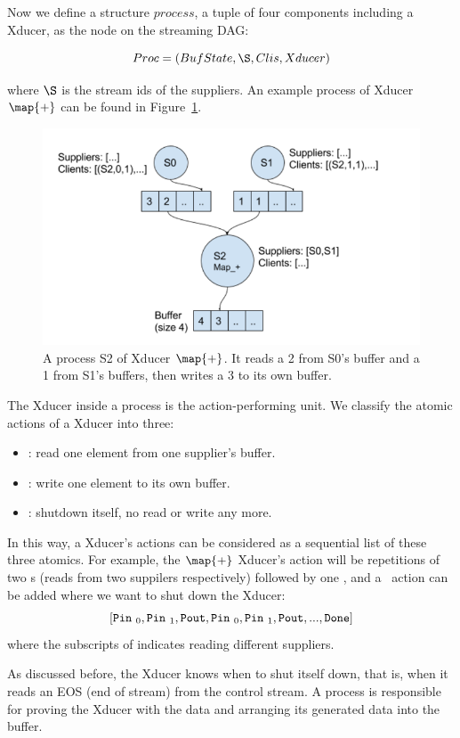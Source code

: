Now we define a structure $process$, a tuple of four components including a Xducer, as the node on the streaming DAG:

$$ \proc  =  (\bufst, \S, \clis, \xducer) $$

where $\S$ is the stream ids of the suppliers. An example process of Xducer $\map{+}$ can be found in Figure~\ref{fig:process}.

\begin{figure}
	\centering
	\includegraphics[width=0.9\linewidth]{fig/process}
	\caption{A process S2 of Xducer $\map{+}$. 
		It reads a 2 from S0's buffer and a 1 from S1's buffers, then writes a 3 to its own buffer.}
	\label{fig:process}
\end{figure}

The Xducer inside a process is the action-performing unit. 
We classify the atomic actions of a Xducer into three:
\begin{itemize}
	\item \pin: read one element from one supplier's buffer.
	\item \pout : write one element to its own buffer.
	\item \done: shutdown itself, no read or write any more.
\end{itemize}

In this way, a Xducer's actions can be considered as a sequential list of these three atomics.
For example,  the $\map{+}$ Xducer's action will be repetitions of two \pin s (reads from two suppilers respectively) followed by one \pout, and 
a \done \ action can be added where we want to shut down the Xducer: 
$$[\texttt{Pin} \ _0, \texttt{Pin} \ _1, \texttt{Pout}, \texttt{Pin} \ _0, \texttt{Pin} \ _1, \texttt{Pout},... ,\texttt{Done}]$$
 where the subscripts of \pin indicates reading different suppliers.

As discussed before, the Xducer knows when to shut itself down, that is, when it reads an EOS (end of stream) from the control stream. 
A process is responsible for proving the Xducer with the data and arranging its generated data into the buffer. 

